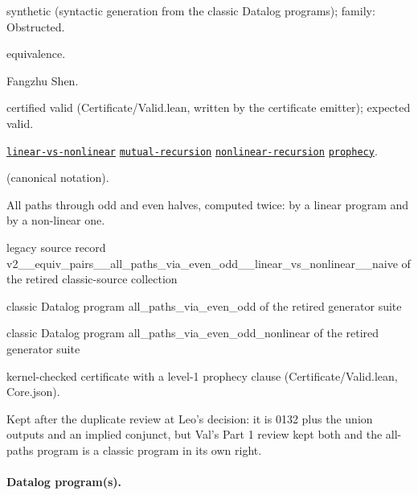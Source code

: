 \documentclass[10pt]{article}
\begin{document}
\begin{description}[leftmargin=2.6cm,style=nextline,itemsep=1pt]

\item[Category] synthetic (syntactic generation from the classic Datalog programs); family: Obstructed.

\item[Kind] equivalence.

\item[Contributors] Fangzhu Shen.

\item[Status] certified valid (Certificate/Valid.lean, written by the certificate emitter); expected valid.

\item[Tags] \hyperref[tag:linear-vs-nonlinear]{\texttt{linear-vs-nonlinear}} \hyperref[tag:mutual-recursion]{\texttt{mutual-recursion}} \hyperref[tag:nonlinear-recursion]{\texttt{nonlinear-recursion}} \hyperref[tag:prophecy]{\texttt{prophecy}}.

\item[Input]  (canonical notation).

\item[Summary] All paths through odd and even halves, computed twice: by a linear program and by a non-linear one.

\item[Sources] {\raggedright legacy source record v2\_\_equiv\_pairs\_\_all\_paths\_via\_even\_odd\_\_linear\_vs\_nonlinear\_\_naive of the retired classic-source collection \par classic Datalog program all\_paths\_via\_even\_odd of the retired generator suite \par classic Datalog program all\_paths\_via\_even\_odd\_nonlinear of the retired generator suite\par}

\item[Prophecy] kernel-checked certificate with a level-1 prophecy clause (Certificate/Valid.lean, Core.json).

\item[Note] Kept after the duplicate review at Leo's decision: it is 0132 plus the union outputs and an implied conjunct, but Val's Part 1 review kept both and the all-paths program is a classic program in its own right.

\end{description}

\paragraph{Datalog program(s).}
\end{document}
